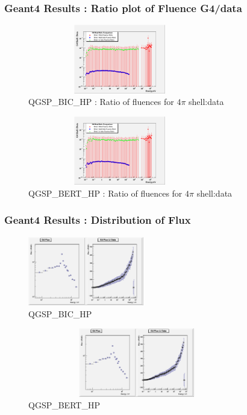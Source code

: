 \documentclass{beamer}
\begin{document}
    \begin{frame}
    \frametitle{Geant4 Results : Ratio plot of Fluence G4/data}
    \vskip -3mm
    \begin{figure}
        \includegraphics[height=30mm, width=80mm] {PICS/RatioBIC.png}
        \caption{\tiny QGSP\_BIC\_HP : Ratio of fluences for $4\pi$ shell:data}
    \end{figure}
    \vskip -7mm
    \begin{figure}
        \includegraphics[height=30mm, width=80mm] {PICS/RatioBERT.png}
        \caption{\tiny QGSP\_BERT\_HP : Ratio of fluences for $4\pi$ shell:data}
    \end{figure}
    \end{frame}

    \begin{frame}
    \frametitle{Geant4 Results : Distribution of Flux}
    \vskip -2mm
    \begin{figure}
    \includegraphics [height=30mm, width=95 mm] {PICS/FluxBIC.png}
    \vskip -2mm
    \caption{\tiny QGSP\_BIC\_HP}
    \end{figure}
    \vskip -7mm
    \begin{figure}
    \includegraphics [height=30mm, width=95mm] {PICS/FluxBERT.png}
    \caption{\tiny QGSP\_BERT\_HP}
    \end{figure}
    \end{frame}
\end{document}
